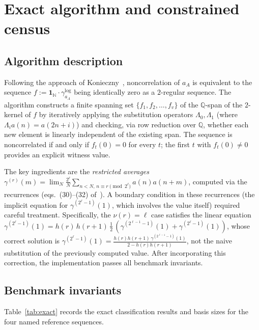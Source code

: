 \documentclass[11pt]{article}
\theoremstyle{definition}
\newcommand{\N}{\mathbb{N}}
\begin{document}
\section{Exact algorithm and constrained census}
\label{sec:exact}

\subsection{Algorithm description}

Following the approach of Konieczny~\cite{Kon21}, noncorrelation of
$a_A$ is equivalent to the sequence
$f := \mathbf{1}_\N \cdot \gamma^{\log}_{a_A}$ being identically zero
as a $2$-regular sequence. The algorithm constructs a finite spanning
set $\{f_1, f_2, \ldots, f_v\}$ of the $\mathbb{Q}$-span of the
$2$-kernel of $f$ by iteratively applying the substitution operators
$\Lambda_0, \Lambda_1$ (where $\Lambda_i a(n) = a(2n+i)$) and
checking, via row reduction over $\mathbb{Q}$, whether each new
element is linearly independent of the existing span. The sequence is
noncorrelated if and only if $f_t(0) = 0$ for every $t$; the first
$t$ with $f_t(0) \neq 0$ provides an explicit witness value.

The key ingredients are the \emph{restricted averages}
$\gamma^{(r)}(m) = \lim_{N} \frac{2^\ell}{N}\sum_{n < N,\, n \equiv r \pmod{2^\ell}} a(n) a(n+m)$,
computed via the recurrences (eqs.~(30)--(32) of~\cite{Kon21}). 
A boundary condition in these recurrences (the implicit equation for
$\gamma^{(2^\ell-1)}(1)$, which involves the value itself) required
careful treatment. Specifically, the $\nu(r) = \ell$ case satisfies
the linear equation
$\gamma^{(2^\ell-1)}(1) = h(r)\,h(r+1)\,\tfrac12\,(\gamma^{(2^{\ell-1}-1)}(1)
+ \gamma^{(2^\ell-1)}(1))$,
whose correct solution is
$\gamma^{(2^\ell-1)}(1) = \tfrac{h(r)h(r+1)\,\gamma^{(2^{\ell-1}-1)}(1)}{2 - h(r)h(r+1)}$,
not the naive substitution of the previously computed value. After
incorporating this correction, the implementation passes all benchmark
invariants.

\subsection{Benchmark invariants}
\label{subsec:benchmarks}

Table~\ref{tab:exact} records the exact classification results and
basis sizes for the four named reference sequences.
\end{document}
